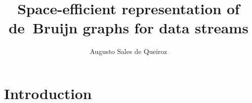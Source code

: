 \documentclass[bsc,en]{ufpethesis}
\institute{Centro de Informática}
\author{Augusto Sales de Queiroz}
\title{Space-efficient representation of de~Bruijn graphs for data streams}
\begin{document}
    \linenumbers
    \frontmatter
    \frontpage
    \presentationpage
    \tableofcontents

    \mainmatter
	\linenumbers
	\doublespacing
    \chapter{Introduction}
    
    
    
    

    \backmatter
    
    
\end{document}
